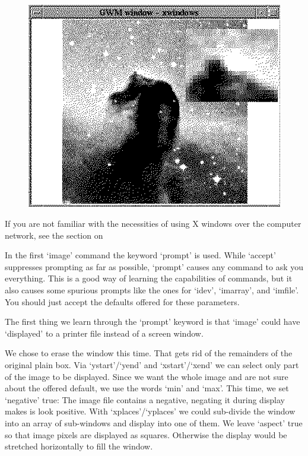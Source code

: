 \begin{latexonly}
\begin{figure}[htb]
\begin{center}
\includegraphics{sun86_imag2.eps}
\end{center}
\end{figure}
\end{latexonly}

   If you are not familiar with the necessities of using X windows over
   the computer network, see
   {the section on }


   In the first `image' command the keyword `prompt' is used. While
   `accept' suppresses prompting as far as possible, `prompt' causes
   any command to ask you everything. This is a good way of learning the
   capabilities of commands, but it also causes some spurious prompts
   like the ones for `idev', `imarray', and `imfile'. You should just
   accept the defaults offered for these parameters.

   The first thing we learn through the `prompt' keyword is that `image'
   could have `displayed' to a printer file instead of a screen window.

   We chose to erase the window this time. That gets rid of the
   remainders of the original plain box. Via `ystart'/`yend' and
   `xstart'/`xend' we can select only part of the image to be displayed.
   Since we want the whole image and are not sure about the offered
   default, we use the words `min' and `max'. This time, we set
   `negative' true: The image file contains a negative, negating it
   during display makes is look positive. With `xplaces'/`yplaces' we
   could sub-divide the window into an array of sub-windows and display
   into one of them. We leave `aspect' true so that image pixels are
   displayed as squares. Otherwise the display would be stretched
   horizontally to fill the window.

